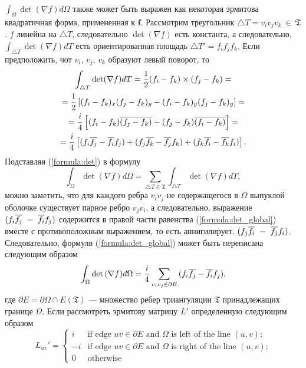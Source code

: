 $\int_{\Omega} \det(\nabla f) d\Omega$ также может быть выражен как некоторая 
эрмитова квадратичная форма, примененная к $\mathbf{f}$. 
Рассмотрим треугольник $\triangle T = v_i v_j v_k~\in~\mathfrak{T}$. 
$f$ линейна на $\triangle T$, следовательно $\det (\nabla f)$ есть константа, 
а следовательно, $\int_{\triangle T} \det (\nabla f) dT$ есть ориентированная площадь 
$\triangle T' = f_i f_j f_k$. 
Если предположить, чот $v_i$, $v_j$, $v_k$ образуют левый поворот, то
\begin{multline}
  \label{formula:det}
  \int_{\triangle T} \det (\nabla f) dT = \frac{1}{2} (f_i - f_k) \times (f_j - f_k) = \\
  = \frac{1}{2} \left[(f_i - f_k)_x (f_j - f_k)_y - (f_i - f_k)_y (f_j - f_k)_y \right] = \\
  = \frac{i}{4} \left[ (f_i - f_k)\overline{(f_j - f_k)} - (f_j - f_k) \overline{(f_i - f_k)} \right] = \\
  = \frac{i}{4} \left[ (f_i \overline{f_j} - \overline{f_i} f_j) + (f_j \overline{f_k} - \overline{f_j} f_k) + 
    (f_k \overline{f_i} - \overline{f_k} f_i) \right].  
\end{multline}
Подставляя (\ref{formula:det}) в формулу
\begin{equation}
  \label{formula:det_global}
  \int_{\Omega} \det {\left( \nabla f \right) } d\Omega = \sum_{\triangle T \in \mathfrak{T}}{ \int_{\triangle T} \det{ \left(\nabla f \right) } dT},
\end{equation}
можно заметить, что для каждого ребра $v_i v_j$ не содержащегося в $\Omega$ выпуклой оболочке
существует парное ребро $v_j v_i$, а следовательно, выражение 
$(f_i \overline{f_j}~-~\overline{f_i} f_j)$ содержится в правой части равенства (\ref{formula:det_global}) вместе с противоположным выражением, то есть аннигилирует.
$(f_j \overline{f_i}~-~\overline{f_j} f_i)$. Следовательно, формулв (\ref{formula:det_global}) 
может быть переписана следующим образом
\begin{equation}
\label{formula:det_over_edges}
  \int_{\Omega} \det {\left( \nabla f \right) } d\Omega = \frac{i}{4} \sum_{v_i v_j \in \partial E}{(f_i \overline{f_j} - \overline{f_i} f_j)},
\end{equation}
где $\partial E = \partial \Omega \cap E(\mathfrak{T})$ --- множество ребер 
триангуляции $\mathfrak{T}$ принадлежащих границе $\Omega$. 
Если рассмотреть эрмитову матрицу $L'$ определенную следующим образом
\begin{equation*}
  L_{uv}' = \begin{cases}
    i  & \text{if edge $uv \in \partial E$ and $\Omega$ is left of the line $(u, v)$;} \\ 
    -i & \text{if edge $uv \in \partial E$ and $\Omega$ is right of the line $(u, v)$;} \\ 
    0  & \text{otherwise}
  \end{cases}
\end{equation*}
